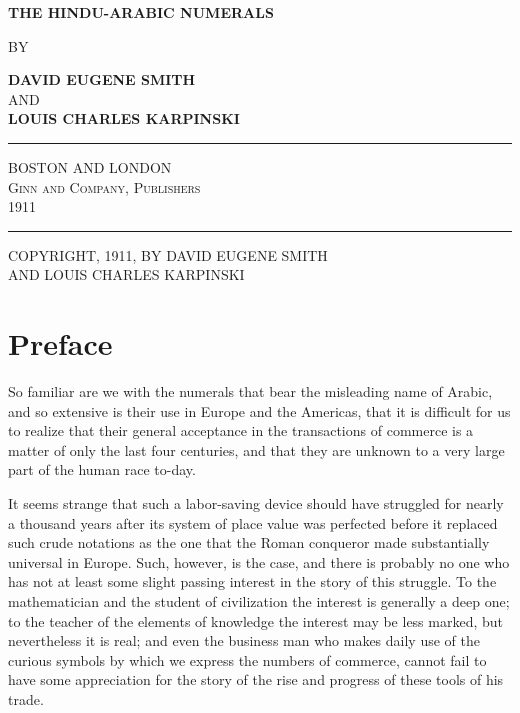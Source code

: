 \documentclass[11pt,a4paper]{article}
\newcommand{\shortline}{\noindent\rule{0.5\textwidth}{0.4pt}\par}
\begin{document}
\thispagestyle{empty}
\begin{center}
\vspace*{2cm}

{\Huge\bfseries\color{titlecolor} THE HINDU-ARABIC NUMERALS}

\vspace{1.5cm}

{\Large BY}

\vspace{0.5cm}

{\LARGE\bfseries DAVID EUGENE SMITH}\\[0.3cm]
{\large AND}\\[0.3cm]
{\LARGE\bfseries LOUIS CHARLES KARPINSKI}

\vspace{2cm}

\shortline

\vspace{0.5cm}

{\large BOSTON AND LONDON}\\[0.2cm]
{\large\scshape Ginn and Company, Publishers}\\[0.3cm]
{\large 1911}

\vspace{1cm}

\shortline

\vfill

{\small COPYRIGHT, 1911, BY DAVID EUGENE SMITH}\\[0.1cm]
{\small AND LOUIS CHARLES KARPINSKI}

\vspace{1cm}
\end{center}
\newpage

\section*{Preface}

So familiar are we with the numerals that bear the misleading name of Arabic, and so extensive is their use in Europe and the Americas, that it is difficult for us to realize that their general acceptance in the transactions of commerce is a matter of only the last four centuries, and that they are unknown to a very large part of the human race to-day.

It seems strange that such a labor-saving device should have struggled for nearly a thousand years after its system of place value was perfected before it replaced such crude notations as the one that the Roman conqueror made substantially universal in Europe. Such, however, is the case, and there is probably no one who has not at least some slight passing interest in the story of this struggle. To the mathematician and the student of civilization the interest is generally a deep one; to the teacher of the elements of knowledge the interest may be less marked, but nevertheless it is real; and even the business man who makes daily use of the curious symbols by which we express the numbers of commerce, cannot fail to have some appreciation for the story of the rise and progress of these tools of his trade.
\end{document}
